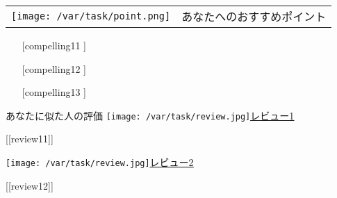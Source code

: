 \documentclass[lualatex,paper=a4,airticle]{jlreq}
\begin{document}
\begin{minipage}[t][0.43\textheight][t]{\textwidth}
\begin{multicols}{2}
    \hspace{-2.3cm} %
    \begin{minipage}{1.25\columnwidth}
      \vspace{-0.4cm}
      \begin{itembox}[l]{
        \begin{tabular}{@{}m{9mm}@{}m{6cm}}
          \texttt{[image: /var/task/point.png]} & \gtfamily\ebseries\large あなたへのおすすめポイント
        \end{tabular}
      }
        \vspace{-1\baselineskip}
        \begin{itemize}
          \setlength{\itemindent}{-10pt}
          \item [[compelling11]]
          \item [[compelling12]]
          \item [[compelling13]]
        \end{itemize}
      \end{itembox}
    \end{minipage}


    \hspace{-2.3cm} %
    \begin{minipage}{1.25\columnwidth}
      \begin{itembox}[l]{{\gtfamily\ebseries\large あなたに似た人の評価}}
        \vspace{-3mm}
        \texttt{[image: /var/task/review.jpg]}\href{[[review_url11]]}{\color{blue}\underline{レビュー1}}\par
        \begin{spacing}{0.5}
          {\small [[review11]]}\par
        \end{spacing}
        \vspace{2mm}
        \texttt{[image: /var/task/review.jpg]}\href{[[review_url12]]}{\color{blue}\underline{レビュー2}}\par
        \begin{spacing}{0.5}
          {\small [[review12]]}\par
        \end{spacing}
        \vspace{2mm}
      \end{itembox}
    \end{minipage}

  \end{multicols}
\end{minipage}
\end{document}
